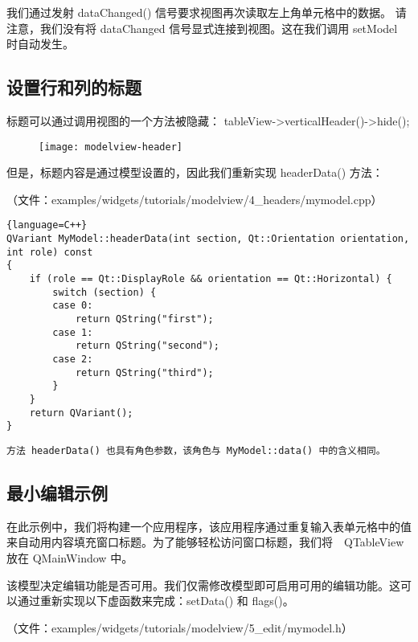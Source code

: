 我们通过发射 dataChanged() 信号要求视图再次读取左上角单元格中的数据。
请注意，我们没有将 dataChanged 信号显式连接到视图。这在我们调用 setModel 时自动发生。

\subsection{设置行和列的标题} 

标题可以通过调用视图的一个方法被隐藏： tableView->verticalHeader()->hide();

\begin{figure}[hbt!]  
\texttt{[image: modelview-header]}
\end{figure}

但是，标题内容是通过模型设置的，因此我们重新实现 headerData() 方法：

（文件：examples/widgets/tutorials/modelview/4\_headers/mymodel.cpp）

\begin{lstlisting}{language=C++}
QVariant MyModel::headerData(int section, Qt::Orientation orientation, int role) const
{
    if (role == Qt::DisplayRole && orientation == Qt::Horizontal) {
        switch (section) {
        case 0:
            return QString("first");
        case 1:
            return QString("second");
        case 2:
            return QString("third");
        }
    }
    return QVariant();
}
\end{lstlisting}

\begin{lstlisting}
方法 headerData() 也具有角色参数，该角色与 MyModel::data() 中的含义相同。
\end{lstlisting}

\subsection{最小编辑示例}

在此示例中，我们将构建一个应用程序，该应用程序通过重复输入表单元格中的值来自动用内容填充窗口标题。为了能够轻松访问窗口标题，我们将　QTableView 放在 QMainWindow 中。

该模型决定编辑功能是否可用。我们仅需修改模型即可启用可用的编辑功能。这可以通过重新实现以下虚函数来完成：setData() 和 flags()。

（文件：examples/widgets/tutorials/modelview/5\_edit/mymodel.h）


